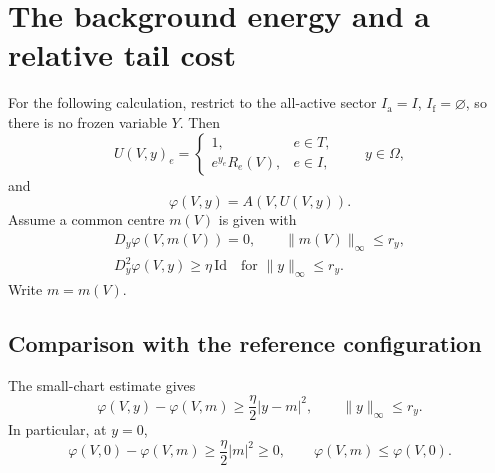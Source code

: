 \documentclass[10pt,reqno]{amsart}
\theoremstyle{definition}
\theoremstyle{remark}
\numberwithin{equation}{section}
\numberwithin{figure}{section}
\newcommand{\Ia}{I_{\mathrm a}}
\newcommand{\If}{I_{\mathrm f}}
\begin{document}
\section{The background energy and a relative tail cost}\label{sec:background-energy}
For the following calculation, restrict to the all-active sector
$\Ia=I$, $\If=\varnothing$, so there is no frozen variable $Y$.
Then
\begin{equation}\label{eq:all-active-configuration}
U(V,y)_e=\begin{cases}
1,&e\in T,\\
e^{y_e}R_e(V),&e\in I,
\end{cases}
\qquad y\in\Omega,
\end{equation}
and
\begin{equation}\label{eq:all-active-action}
\varphi(V,y)=A(V,U(V,y)).
\end{equation}
Assume a common centre $m(V)$ is given with
\begin{equation}\label{eq:all-active-centre-input}
\begin{gathered}
D_y\varphi(V,m(V))=0,\qquad\|m(V)\|_\infty\le r_y,\\
D_y^2\varphi(V,y)\ge\eta\,\mathrm{Id}
\quad\text{for }\|y\|_\infty\le r_y.
\end{gathered}
\end{equation}
Write $m=m(V)$.

\subsection{Comparison with the reference configuration}
The small-chart estimate gives
\begin{equation}\label{eq:reference-centre-comparison}
\varphi(V,y)-\varphi(V,m)\ge\frac\eta2|y-m|^2,
\qquad\|y\|_\infty\le r_y.
\end{equation}
In particular, at $y=0$,
\begin{equation}\label{eq:reference-zero-comparison}
\varphi(V,0)-\varphi(V,m)\ge\frac\eta2|m|^2\ge0,
\qquad \varphi(V,m)\le\varphi(V,0).
\end{equation}
\end{document}
